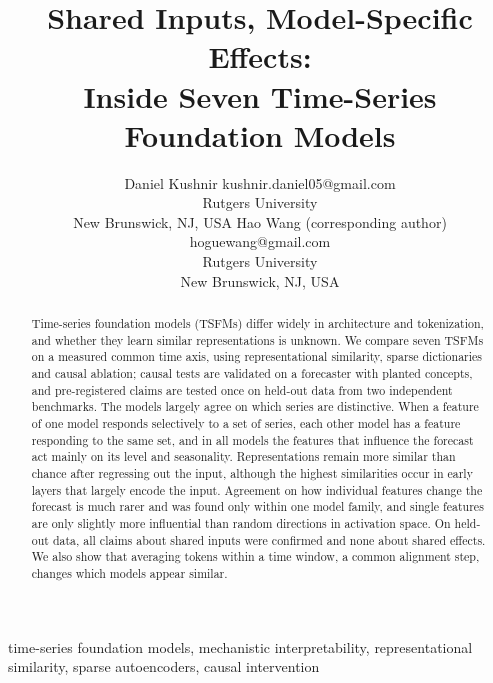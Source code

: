 \documentclass[twoside,11pt]{article}
\begin{document}
\title{Shared Inputs, Model-Specific Effects:\\ Inside Seven Time-Series Foundation Models}

\author{\name Daniel Kushnir \email kushnir.daniel05@gmail.com \\
\addr Rutgers University \\
New Brunswick, NJ, USA
\AND
\name Hao Wang (corresponding author) \email hoguewang@gmail.com \\
\addr Rutgers University \\
New Brunswick, NJ, USA}

\editor{}

\maketitle

\begin{abstract}
Time-series foundation models (TSFMs) differ widely in architecture and tokenization, and whether they learn similar representations is unknown.
We compare seven TSFMs on a measured common time axis, using representational similarity, sparse dictionaries and causal ablation; causal tests are validated on a forecaster with planted concepts, and pre-registered claims are tested once on held-out data from two independent benchmarks.
The models largely agree on which series are distinctive.
When a feature of one model responds selectively to a set of series, each other model has a feature responding to the same set, and in all models the features that influence the forecast act mainly on its level and seasonality.
Representations remain more similar than chance after regressing out the input, although the highest similarities occur in early layers that largely encode the input.
Agreement on how individual features change the forecast is much rarer and was found only within one model family, and single features are only slightly more influential than random directions in activation space.
On held-out data, all claims about shared inputs were confirmed and none about shared effects.
We also show that averaging tokens within a time window, a common alignment step, changes which models appear similar.
\end{abstract}

\begin{keywords}
time-series foundation models, mechanistic interpretability, representational similarity, sparse autoencoders, causal intervention
\end{keywords}
\end{document}
